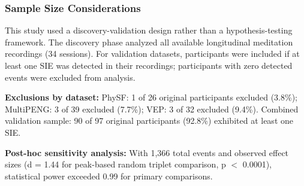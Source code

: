 \documentclass[11pt,a4paper]{article}
\begin{document}
\begin{table}[h]
    \centering
    \caption{Dataset Characteristics}
    \label{tab:placeholder_label}
\end{table}

\subsubsection{Sample Size Considerations}
This study used a discovery-validation design rather than a hypothesis-testing framework. The discovery phase analyzed all available longitudinal meditation recordings (34 sessions). For validation datasets, participants were included if at least one SIE was detected in their recordings; participants with zero detected events were excluded from analysis.

\textbf{Exclusions by dataset:} PhySF: 1 of 26 original participants excluded (3.8\%); MultiPENG: 3 of 39 excluded (7.7\%); VEP: 3 of 32 excluded (9.4\%). Combined validation sample: 90 of 97 original participants (92.8\%) exhibited at least one SIE.

\textbf{Post-hoc sensitivity analysis:} With 1,366 total events and observed effect sizes (d = 1.44 for peak-based random triplet comparison, p $<$ 0.0001), statistical power exceeded 0.99 for primary comparisons.
\end{document}
